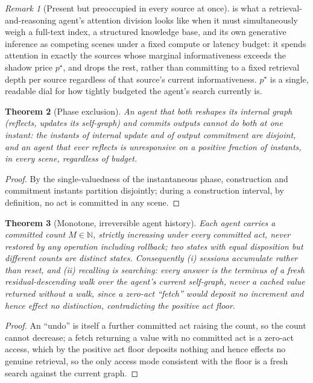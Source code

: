 \documentclass[11pt,twocolumn,a4paper]{article}
\theoremstyle{frathm}
\newtheorem{theorem}{Theorem}[section]
\theoremstyle{definition}
\theoremstyle{remark}
\newtheorem{remark}[theorem]{Remark}
\newcommand{\N}{\mathbb{N}}
\newcommand{\rec}{M}
\newcommand{\price}{p^{\star}}
\begin{document}
\begin{remark}[Present but preoccupied in every source at once]
\label{rem:preoccupied}
 is what a retrieval-and-reasoning agent's attention
division looks like when it must simultaneously weigh a full-text index, a
structured knowledge base, and its own generative inference as competing
scenes under a fixed compute or latency budget: it spends attention in
exactly the sources whose marginal informativeness exceeds the shadow
price $\price$, and drops the rest, rather than committing to a fixed
retrieval depth per source regardless of that source's current
informativeness. $\price$ is a single, readable dial for how tightly
budgeted the agent's search currently is.
\end{remark}

\begin{theorem}[Phase exclusion]
\label{thm:phase}
An agent that both reshapes its internal graph (reflects, updates its
self-graph) and commits outputs cannot do both at one instant: the
instants of internal update and of output commitment are disjoint, and an
agent that ever reflects is unresponsive on a positive fraction of
instants, in every scene, regardless of budget.
\end{theorem}

\begin{proof}
By the single-valuedness of the instantaneous phase, construction and
commitment instants partition disjointly; during a construction interval,
by definition, no act is committed in any scene.
\end{proof}

\begin{theorem}[Monotone, irreversible agent history]
\label{thm:history}
Each agent carries a committed count $\rec\in\N$, strictly increasing
under every committed act, never restored by any operation including
rollback; two states with equal disposition but different counts are
distinct states. Consequently \textup{(i)} sessions accumulate rather
than reset, and \textup{(ii)} recalling is searching: every answer is the
terminus of a fresh residual-descending walk over the agent's
\emph{current} self-graph, never a cached value returned without a walk,
since a zero-act ``fetch'' would deposit no increment and hence effect no
distinction, contradicting the positive act floor.
\end{theorem}

\begin{proof}
An ``undo'' is itself a further committed act raising the count, so the
count cannot decrease; a fetch returning a value with no committed act
is a zero-act access, which by the positive act floor deposits nothing
and hence effects no genuine retrieval, so the only access mode
consistent with the floor is a fresh search against the current graph.
\end{proof}
\end{document}
